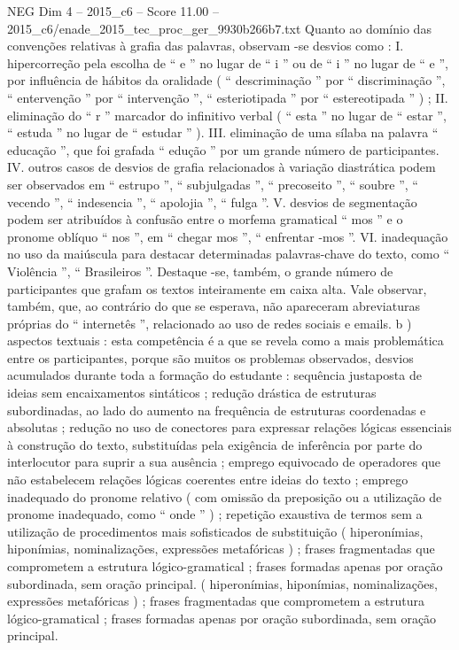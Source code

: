 \begin{textsample}{NEG Dim 4 – 2015\_c6 – Score 11.00 – 2015\_c6/enade\_2015\_tec\_proc\_ger\_9930b266b7.txt}
Quanto ao domínio das convenções relativas à grafia das palavras, observam -se desvios como : I. hipercorreção pela escolha de “ e ” no lugar de “ i ” ou de “ i ” no lugar de “ e ”, por influência de hábitos da oralidade ( “ descriminação ” por “ discriminação ”, “ entervenção ” por “ intervenção ”, “ esteriotipada ” por “ estereotipada ” ) ; II. eliminação do “ r ” marcador do infinitivo verbal ( “ esta ” no lugar de “ estar ”, “ estuda ” no lugar de “ estudar ” ).
III. eliminação de uma sílaba na palavra “ educação ”, que foi grafada “ edução ” por um grande número de participantes.
IV. outros casos de desvios de grafia relacionados à variação diastrática podem ser observados em “ estrupo ”, “ subjulgadas ”, “ precoseito ”, “ soubre ”, “ vecendo ”, “ indesencia ”, “ apolojia ”, “ fulga ”.
V. desvios de segmentação podem ser atribuídos à confusão entre o morfema gramatical “ mos ” e o pronome oblíquo “ nos ”, em “ chegar mos ”, “ enfrentar -mos ”.
VI. inadequação no uso da maiúscula para destacar determinadas palavras-chave do texto, como “ Violência ”, “ Brasileiros ”.
Destaque -se, também, o grande número de participantes que grafam os textos inteiramente em caixa alta.
Vale observar, também, que, ao contrário do que se esperava, não apareceram abreviaturas próprias do “ internetês ”, relacionado ao uso de redes sociais e emails. b ) aspectos textuais : esta competência é a que se revela como a mais problemática entre os participantes, porque são muitos os problemas observados, desvios acumulados durante toda a formação do estudante : sequência justaposta de ideias sem encaixamentos sintáticos ; redução drástica de estruturas subordinadas, ao lado do aumento na frequência de estruturas coordenadas e absolutas ; redução no uso de conectores para expressar relações lógicas essenciais à construção do texto, substituídas pela exigência de inferência por parte do interlocutor para suprir a sua ausência ; emprego equivocado de operadores que não estabelecem relações lógicas coerentes entre ideias do texto ; emprego inadequado do pronome relativo ( com omissão da preposição ou a utilização de pronome inadequado, como “ onde ” ) ; repetição exaustiva de termos sem a utilização de procedimentos mais sofisticados de substituição ( hiperonímias, hiponímias, nominalizações, expressões metafóricas ) ; frases fragmentadas que comprometem a estrutura lógico-gramatical ; frases formadas apenas por oração subordinada, sem oração principal. ( hiperonímias, hiponímias, nominalizações, expressões metafóricas ) ; frases fragmentadas que comprometem a estrutura lógico-gramatical ; frases formadas apenas por oração subordinada, sem oração principal.

\end{textsample}
